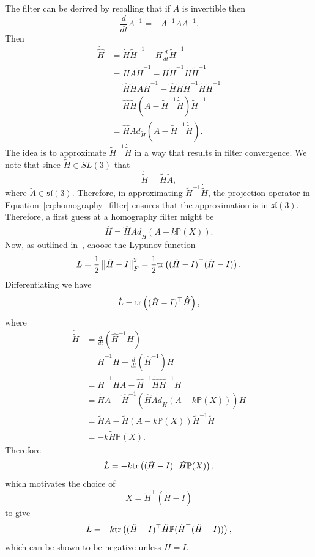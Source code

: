 The filter can be derived by recalling that if $A$ is invertible then
\[
\frac{d}{dt}A^{-1} = - A^{-1}\dot{A}A^{-1}.
\]
Then 
\begin{align*}
\dot{\hat{H}} &= \dot{H}\tilde{H}^{-1} + H\frac{d}{dt}\tilde{H}^{-1} \\
&= HA\tilde{H}^{-1} - H\tilde{H}^{-1}\dot{\tilde{H}}\tilde{H}^{-1} \\
&= \hat{H}\tilde{H}A\tilde{H}^{-1} - \hat{H}\tilde{H}\tilde{H}^{-1}\dot{\tilde{H}}\tilde{H}^{-1} \\
&= \hat{H}\tilde{H}\left(A-\tilde{H}^{-1}\dot{\tilde{H}}\right)\tilde{H}^{-1} \\
&= \hat{H}Ad_{\tilde{H}}\left(A-\tilde{H}^{-1}\dot{\tilde{H}}\right).
\end{align*}
The idea is to approximate $\tilde{H}^{-1}\dot{\tilde{H}}$ in a way that results in filter convergence.  We note that since $\tilde{H}\in SL(3)$ that 
\[
\dot{\tilde{H}}= \tilde{H}\tilde{A},
\]
where $\tilde{A}\in\mathfrak{sl}(3)$.  Therefore, in approximating $\tilde{H}^{-1}\dot{\tilde{H}}$, the projection operator in Equation~\eqref{eq:homography_filter} ensures that the approximation is in $\mathfrak{sl}(3)$.  Therefore, a first guess at a homography filter might be
\[
\dot{\hat{H}} = \hat{H} Ad_{\tilde{H}}\left(A-k\mathbb{P}(X)\right).
\]
Now, as outlined in~\cite{MahonyHamelMorinMalis12}, choose the Lypunov function
\[
L = \frac{1}{2}\left\|\tilde{H}-I\right\|_F^2 = \frac{1}{2} 
\text{tr}\left((\tilde{H}-I)^{\top}(\tilde{H}-I)\right).
\]
Differentiating we have
\[
\dot{L} = \text{tr}\left((\tilde{H}-I)^\top \dot{\tilde{H}}\right),
\]
where 
\begin{align*}
\dot{\tilde{H}} &= \frac{d}{dt}(\hat{H}^{-1}H) \\
&= \hat{H}^{-1}\dot{H} + \frac{d}{dt}(\hat{H}^{-1})H \\
&= \hat{H}^{-1}HA - \hat{H}^{-1}\dot{\hat{H}}\hat{H}^{-1}H \\
&= \tilde{H}A - \hat{H}^{-1}(\hat{H} Ad_{\tilde{H}}\left(A-k\mathbb{P}(X)\right))\tilde{H} \\
&= \tilde{H}A - \tilde{H}(A-k\mathbb{P}(X))\tilde{H}^{-1}\tilde{H} \\
&= -k\tilde{H}\mathbb{P}(X).
\end{align*}
Therefore
\[
\dot{L} = -k \text{tr}\left((\tilde{H}-I)^\top\tilde{H}\mathbb{P}(X)\right),
\]
which motivates the choice of 
\[
X = \tilde{H}^\top(\tilde{H}-I)
\]
to give
\begin{align*}
\dot{L} = -k \text{tr}\left((\tilde{H}-I)^\top\tilde{H}\mathbb{P}(\tilde{H}^\top(\tilde{H}-I))\right),
\end{align*}
which can be shown to be negative unless $\tilde{H}=I$.

